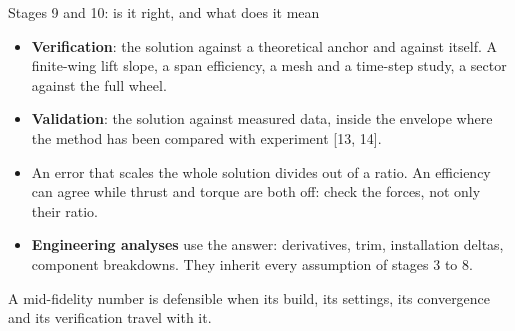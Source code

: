 \begin{frame}{Stages 9 and 10: is it right, and what does it mean}
\begin{itemize}\small
  \item \textbf{Verification}: the solution against a theoretical anchor and
        against itself. A finite-wing lift slope, a span efficiency, a mesh
        and a time-step study, a sector against the full wheel.
  \item \textbf{Validation}: the solution against measured data, inside the
        envelope where the method has been compared with experiment
        [13, 14].
  \item An error that scales the whole solution divides out of a ratio. An
        efficiency can agree while thrust and torque are both off: check the
        forces, not only their ratio.
  \item \textbf{Engineering analyses} use the answer: derivatives, trim,
        installation deltas, component breakdowns. They inherit every
        assumption of stages 3 to 8.
\end{itemize}
\begin{takeaway}A mid-fidelity number is defensible when its build, its
settings, its convergence and its verification travel with it.\end{takeaway}
\end{frame}
